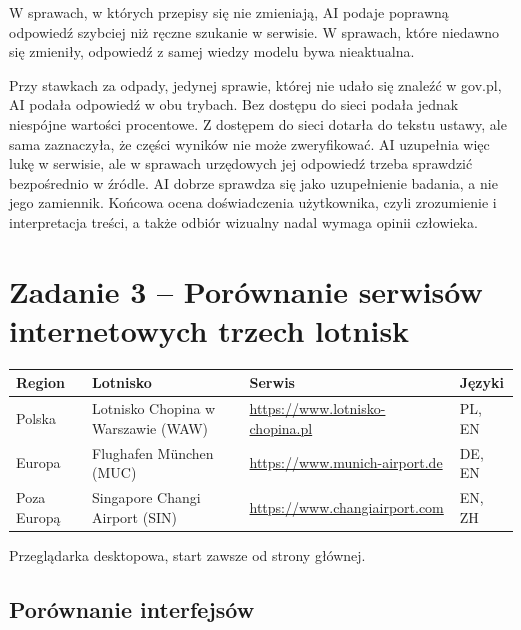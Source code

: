 \documentclass[11pt,a4paper]{article}
\begin{document}
W sprawach, w których przepisy się nie zmieniają, AI podaje poprawną odpowiedź szybciej niż ręczne szukanie w serwisie. W sprawach, które niedawno się zmieniły, odpowiedź z samej wiedzy modelu bywa nieaktualna.

Przy stawkach za odpady, jedynej sprawie, której nie udało się znaleźć w gov.pl, AI podała odpowiedź w obu trybach. Bez dostępu do sieci podała jednak niespójne wartości procentowe. Z dostępem do sieci dotarła do tekstu ustawy, ale sama zaznaczyła, że części wyników nie może zweryfikować. AI uzupełnia więc lukę w serwisie, ale w sprawach urzędowych jej odpowiedź trzeba sprawdzić bezpośrednio w źródle. AI dobrze sprawdza się jako uzupełnienie badania, a nie jego zamiennik. Końcowa ocena doświadczenia użytkownika, czyli zrozumienie i interpretacja treści, a także odbiór wizualny nadal wymaga opinii człowieka.

\newpage
\section{Zadanie 3 -- Porównanie serwisów internetowych trzech lotnisk}

{\small
\begin{tabularx}{\textwidth}{@{}L{2.2cm}L{4.6cm}YC{1.4cm}@{}}
\toprule
Region & Lotnisko & Serwis & Języki \\
\midrule
Polska & Lotnisko Chopina w Warszawie (WAW) & \url{https://www.lotnisko-chopina.pl} & PL, EN \\
Europa & Flughafen München (MUC) & \url{https://www.munich-airport.de} & DE, EN \\
Poza Europą & Singapore Changi Airport (SIN) & \url{https://www.changiairport.com} & EN, ZH \\
\bottomrule
\end{tabularx}
}

Przeglądarka desktopowa, start zawsze od strony głównej.

\subsection{Porównanie interfejsów}
\end{document}

